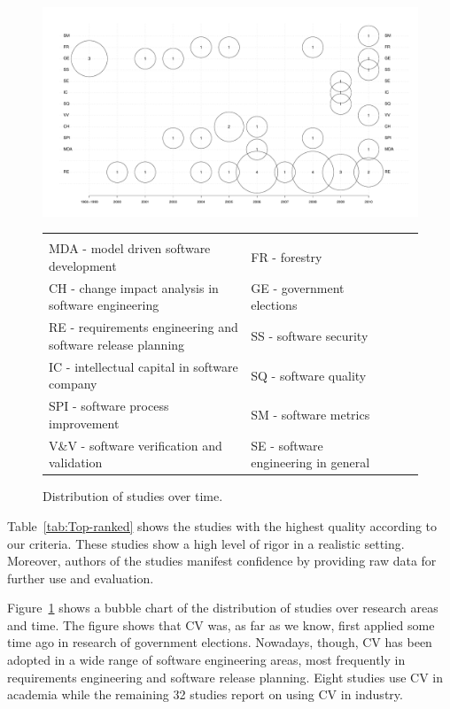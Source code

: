 \begin{figure}
\center
\includegraphics[bb=70bp 40bp 1180bp 670bp,clip,scale=0.28]{fig/bubble}

\begin{tabular}
{l>{\raggedright}b{}l>{\raggedright}b{}l} 
&\tabularnewline
\tiny
MDA - model driven software development  					& \tiny FR - forestry  \tabularnewline
\tiny CH - change impact analysis in software engineering 			& \tiny GE - government elections \tabularnewline
\tiny RE - requirements engineering and software release planning 	& \tiny SS - software security \tabularnewline
\tiny IC - intellectual capital in software company 				& \tiny SQ - software quality \tabularnewline
\tiny SPI - software process improvement 						& \tiny SM - software metrics \tabularnewline
\tiny V\&V - software verification and validation & \tiny SE - software engineering in general\tabularnewline
\end{tabular}
\caption{\label{fig:bubble}Distribution of studies over time.}

\end{figure}

Table~\ref{tab:Top-ranked} shows the studies with the highest quality according to our criteria.
These studies show a high level of rigor in a realistic setting. Moreover, authors of the studies manifest confidence by providing raw data for further use and evaluation.

Figure~\ref{fig:bubble} shows a bubble chart of the distribution of studies over research areas and time.
The figure shows that CV was, as far as we know, first applied some time ago in research of government elections.
Nowadays, though, CV has been adopted in a wide range of software engineering areas, most frequently in requirements engineering and software release planning.
Eight studies use CV in academia while the remaining 32 studies report on using CV in industry.

